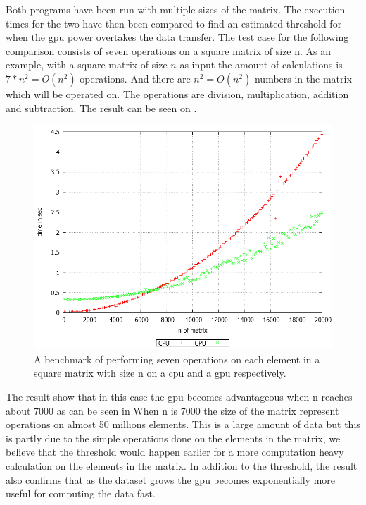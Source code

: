 Both programs have been run with multiple sizes of the matrix.
The execution times for the two have then been compared to find an estimated threshold for when the \acrshort{gpu} power overtakes the data transfer.
The test case for the following comparison consists of seven operations on a square matrix of size n.
As an example, with a square matrix of size $n$ as input the amount of calculations is $7*n^2 = O(n^2)$ operations. 
And there are $n^2 = O(n^2)$ numbers in the matrix which will be operated on.
The operations are division, multiplication, addition and subtraction.
The result can be seen on .
\begin{figure}[h!]
\centering
 \includegraphics[width=1\textwidth]{figures/benchmark.png} %
\caption{A benchmark of performing seven operations on each element in a square matrix with size n on a \acrshort{cpu} and a \acrshort{gpu} respectively.}\label{image:benchmark}
\vspace{-15pt}
\end{figure}

The result show that in this case the \acrshort{gpu} becomes advantageous when n reaches about 7000 as can be seen in 
When n is 7000 the size of the matrix represent operations on almost 50 millions elements.
This is a large amount of data but this is partly due to the simple operations done on the elements in the matrix, we believe that the threshold would happen earlier for a more computation heavy calculation on the elements in the matrix.
In addition to the threshold, the result also confirms that as the dataset grows the \acrshort{gpu} becomes exponentially more useful for computing the data fast.

